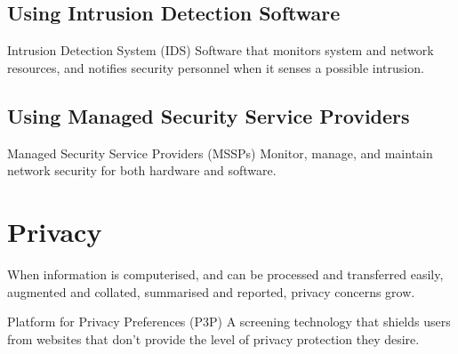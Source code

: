 \documentclass[\main/notes.tex]{subfiles}
\begin{document}
			\subsection{Using Intrusion Detection Software}
				\begin{definition}{Intrusion Detection System (IDS)}
					Software that monitors system and network resources, and notifies security personnel when it senses a possible intrusion.
				\end{definition}
			\subsection{Using Managed Security Service Providers}
				\begin{definition}{Managed Security Service Providers (MSSPs)}
					Monitor, manage, and maintain network security for both hardware and software.
				\end{definition}

		\section{Privacy}
			When information is computerised, and can be processed and transferred easily, augmented and collated, summarised and reported, privacy concerns grow.
			\begin{definition}{Platform for Privacy Preferences (P3P)}
				A screening technology that shields users from websites that don't provide the level of privacy protection they desire.
			\end{definition}
\end{document}
